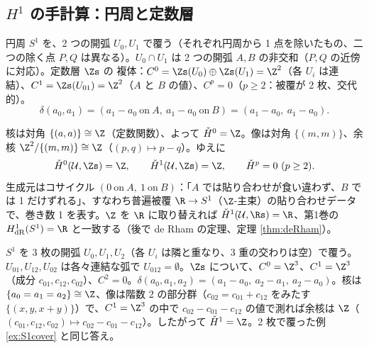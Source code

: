 \subsection{$H^1$ の手計算：円周と定数層}
\begin{ex}[$S^1$、2 枚の弧による被覆]\label{ex:S1cover}
円周 $S^1$ を、2 つの開弧 $U_0,U_1$ で覆う（それぞれ円周から 1 点を除いたもの、二つの除く点 $P,Q$ は異なる）。$U_0\cap U_1$ は 2 つの開弧 $A,B$ の非交和（$P,Q$ の近傍に対応）。定数層 $\Zs$ の \Cech{} 複体：$C^0=\Zs(U_0)\oplus\Zs(U_1)=\Z^2$（各 $U_i$ は連結）、$C^1=\Zs(U_{01})=\Z^2$（$A$ と $B$ の値）、$C^p=0$（$p\ge2$：被覆が 2 枚、交代的）。
\[
\delta(a_0,a_1)=(a_1-a_0\ \text{on}\ A,\ a_1-a_0\ \text{on}\ B)=(a_1-a_0,\ a_1-a_0).
\]
\begin{center}
\end{center}
核は対角 $\{(a,a)\}\cong\Z$（定数関数）、よって $\check H^0=\Z$。像は対角 $\{(m,m)\}$、余核 $\Z^2/\{(m,m)\}\cong\Z$（$(p,q)\mapsto p-q$）。ゆえに
\[
\check H^0(\mathcal U,\Zs)=\Z,\qquad\check H^1(\mathcal U,\Zs)=\Z,\qquad\check H^p=0\ (p\ge2).
\]
生成元はコサイクル $(0\ \text{on}\ A,\ 1\ \text{on}\ B)$：「$A$ では貼り合わせが食い違わず、$B$ では 1 だけずれる」、すなわち普遍被覆 $\R\to S^1$（$\Z$-主束）の貼り合わせデータで、巻き数 1 を表す。$\Z$ を $\R$ に取り替えれば $\check H^1(\mathcal U,\Rs)=\R$、第1巻の $H^1_{\mathrm{dR}}(S^1)=\R$ と一致する（後で de Rham の定理、定理 \ref{thm:deRham}）。
\end{ex}
\begin{ex}[$S^1$、3 枚の弧による被覆]\label{ex:S1three}
$S^1$ を 3 枚の開弧 $U_0,U_1,U_2$（各 $U_i$ は隣と重なり、3 重の交わりは空）で覆う。$U_{01},U_{12},U_{02}$ は各々連結な弧で $U_{012}=\emptyset$。$\Zs$ について、$C^0=\Z^3$、$C^1=\Z^3$（成分 $c_{01},c_{12},c_{02}$）、$C^2=0$。$\delta(a_0,a_1,a_2)=(a_1-a_0,\ a_2-a_1,\ a_2-a_0)$。核は $\{a_0=a_1=a_2\}\cong\Z$、像は階数 2 の部分群（$c_{02}=c_{01}+c_{12}$ をみたす $\{(x,y,x+y)\}$）で、$C^1=\Z^3$ の中で $c_{02}-c_{01}-c_{12}$ の値で測れば余核は $\Z$（$(c_{01},c_{12},c_{02})\mapsto c_{02}-c_{01}-c_{12}$）。したがって $\check H^1=\Z$。2 枚で覆った例 \ref{ex:S1cover} と同じ答え。
\begin{center}
\end{center}
\end{ex}
